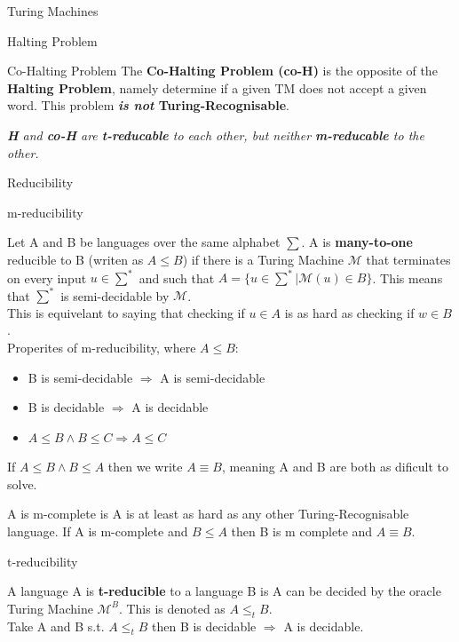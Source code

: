\documentclass[12pt, letterpaper]{article}
\begin{document}
\begin{section}{Turing Machines}
\begin{subsection}{Halting Problem}
\begin{subsubsection}{Co-Halting Problem}
      The \textbf{Co-Halting Problem (co-H)} is the opposite of the \textbf{Halting Problem},
      namely determine if a given TM does not accept a given word. This problem
      \textbf{\emph{is not} Turing-Recognisable}.

    \end{subsubsection}

    \emph{\textbf{H} and \textbf{co-H} are \textbf{t-reducable} to each other, but
      neither \textbf{m-reducable} to the other.}

  \end{subsection}

  \begin{subsection}{Reducibility}

    \begin{subsubsection}{m-reducibility}

      Let A and B be languages over the same alphabet \(\sum\).
      A is \textbf{many-to-one} reducible to B (writen as \(A \leq B\)) if
      there is a Turing Machine \(\mathscr{M}\) that terminates on every input
      \(u \in \sum^{*}\) and such that \(A=\{{} u \in \sum^{*} | \mathscr{M}(u) \in B\}\).
      This means that \(\sum^{*}\) is semi-decidable by \(\mathscr{M}\). \\
      This is equivelant to saying that checking if \(u \in A\) is as hard as
      checking if \(w \in B\). \\
      Properites of m-reducibility, where \(A \leq B\):
      \begin{itemize}
        \item B is semi-decidable \(\Rightarrow\) A is semi-decidable
        \item B is decidable \(\Rightarrow\) A is decidable
        \item \(A \leq B \land B \leq C \Rightarrow A \leq C\)
      \end{itemize}

      If \(A \leq B \land B \leq A\) then we write \(A \equiv B\), meaning
      A and B are both as dificult to solve.

      A is m-complete is A is at least as hard as any other Turing-Recognisable language.
      If A is m-complete and \(B \leq A\) then B is m complete and \(A \equiv B\).

    \end{subsubsection}

    \begin{subsubsection}{t-reducibility}

      A language A is \textbf{t-reducible} to a language B is A can be decided
      by the oracle Turing Machine \(\mathscr{M}^{B}\). This is denoted as
      \(A \leq_{t} B\). \\
      Take A and B s.t. \(A \leq_{t} B\) then
      B is decidable \(\Rightarrow\) A is decidable.


\end{subsubsection}
\end{subsection}
\end{section}
\end{document}
